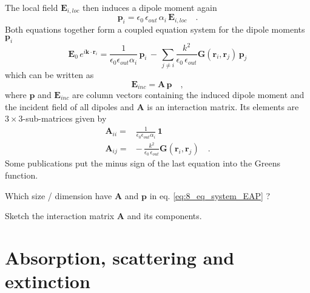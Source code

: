 The local field $\mathbf{E}_{i, loc}$ then induces a dipole moment again 
\begin{equation}
\mathbf{p}_i = \epsilon_0 \, \epsilon_{out} \, \alpha_i \, \mathbf{E}_{i,loc} \quad .
\end{equation}
Both equations together form a coupled equation system for the 
 dipole moments $ \mathbf{p}_i$
\begin{equation}
\mathbf{E}_{0} \, e^{i \mathbf{k} \cdot \mathbf{r}_i} =
\frac{1}{\epsilon_0 \epsilon_{out} \alpha_i} \, \mathbf{p}_i 
 \,  - \, 
 \sum_{j \neq i} \frac{k^2}{\epsilon_0 \, \epsilon_{out}} 
 \mathbf{G}(\mathbf{r}_i, \mathbf{r}_j)  \, \mathbf{p}_j 
\end{equation} 
 which can be written as
 \begin{equation}
 \mathbf{E}_{inc} = \mathbf{A} \, \mathbf{p} \quad , \label{eq:8_eq_system_EAP}
 \end{equation}
where $\mathbf{p}$ and $ \mathbf{E}_{inc} $ are column vectors containing the induced dipole moment and the incident field of all dipoles and $\mathbf{A} $ is an interaction matrix. Its elements are $3 \times 3$-sub-matrices given by
 \begin{align}
 \mathbf{A}_{ii} = &\frac{1}{\epsilon_0 \epsilon_{out} \alpha_i} \, \mathbf{1} \\
 \mathbf{A}_{ij} = & - \, 
 \frac{k^2}{\epsilon_0 \, \epsilon_{out}} 
 \mathbf{G}(\mathbf{r}_i, \mathbf{r}_j)  \quad .
 \end{align}
Some publications put the minus sign of the last equation into the Greens function. 

\begin{questions} 
\item Which size / dimension have $ \mathbf{A}$ and $\mathbf{p}$ in eq. \ref{eq:8_eq_system_EAP} ?
\item Sketch the interaction matrix $ \mathbf{A}$ and its components.
\end{questions}

\section{Absorption, scattering and extinction} 
 
